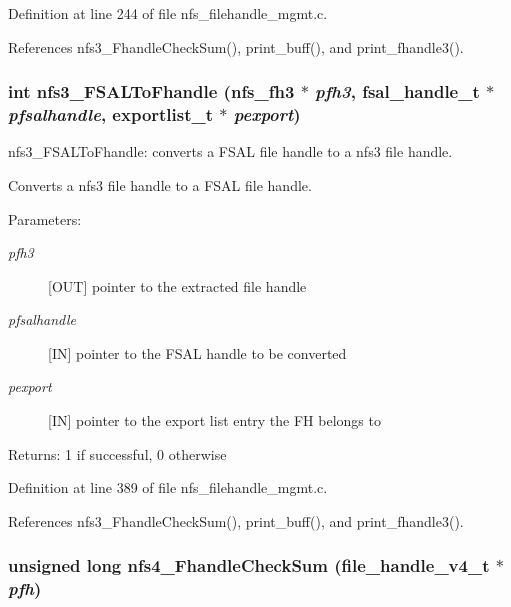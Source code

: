 Definition at line 244 of file nfs\_\-filehandle\_\-mgmt.c.

References nfs3\_\-Fhandle\-Check\-Sum(), print\_\-buff(), and print\_\-fhandle3().
\subsubsection{\setlength{\rightskip}{0pt plus 5cm}int nfs3\_\-FSALTo\-Fhandle (nfs\_\-fh3 $\ast$ {\em pfh3}, fsal\_\-handle\_\-t $\ast$ {\em pfsalhandle}, exportlist\_\-t $\ast$ {\em pexport})}\label{nfs__filehandle__mgmt_8c_a6}


nfs3\_\-FSALTo\-Fhandle: converts a FSAL file handle to a nfs3 file handle.

Converts a nfs3 file handle to a FSAL file handle.

\begin{Desc}
\item[Parameters:]
\begin{description}
\item[{\em pfh3}][OUT] pointer to the extracted file handle \item[{\em pfsalhandle}][IN] pointer to the FSAL handle to be converted \item[{\em pexport}][IN] pointer to the export list entry the FH belongs to\end{description}
\end{Desc}
\begin{Desc}
\item[Returns:]1 if successful, 0 otherwise \end{Desc}


Definition at line 389 of file nfs\_\-filehandle\_\-mgmt.c.

References nfs3\_\-Fhandle\-Check\-Sum(), print\_\-buff(), and print\_\-fhandle3().
\subsubsection{\setlength{\rightskip}{0pt plus 5cm}unsigned long nfs4\_\-Fhandle\-Check\-Sum (file\_\-handle\_\-v4\_\-t $\ast$ {\em pfh})}\label{nfs__filehandle__mgmt_8c_a17}


